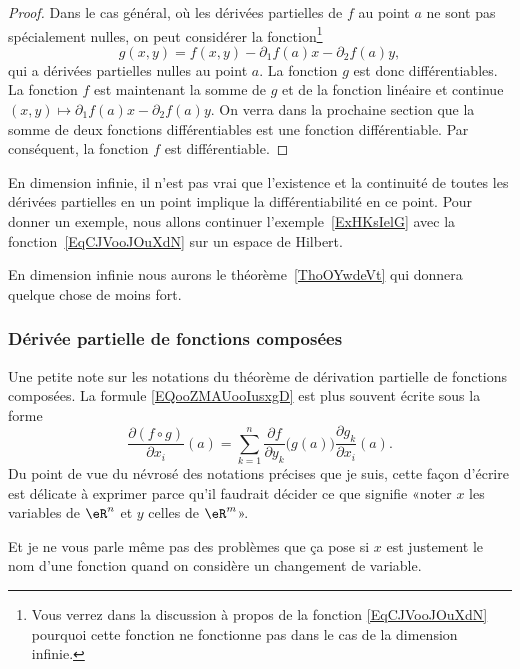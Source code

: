 \begin{proof}
	Dans le cas général, où les dérivées partielles de \( f\) au point \( a\) ne sont pas spécialement nulles, on peut considérer la fonction\footnote{Vous verrez dans la discussion à propos de la fonction \eqref{EqCJVooJOuXdN} pourquoi cette fonction ne fonctionne pas dans le cas de la dimension infinie.}
	\begin{equation}    \label{EqXHVooJeQKrB}
		g(x,y)=f(x,y)-\partial_1 f(a)x-\partial_2 f(a)y,
	\end{equation}
	qui a dérivées partielles nulles au point \( a\). La fonction \( g\) est donc différentiables. La fonction \( f\) est maintenant la somme de \( g\) et de la fonction linéaire et continue \( (x,y)\mapsto \partial_1 f(a)x-\partial_2 f(a)y\). On verra dans la prochaine section que la somme de deux fonctions différentiables est une fonction différentiable. Par conséquent, la fonction \( f\) est différentiable.
\end{proof}

\begin{remark}
	En dimension infinie, il n'est pas vrai que l'existence et la continuité de toutes les dérivées partielles en un point implique la différentiabilité en ce point. Pour donner un exemple, nous allons continuer l'exemple~\ref{ExHKsIelG}
	avec la fonction~\ref{EqCJVooJOuXdN} sur un espace de Hilbert.

	En dimension infinie nous aurons le théorème~\ref{ThoOYwdeVt} qui donnera quelque chose de moins fort.
\end{remark}

\subsubsection{Dérivée partielle de fonctions composées}

\begin{normaltext}
	Une petite note sur les notations du théorème de dérivation partielle de fonctions composées. La formule \eqref{EQooZMAUooIusxgD} est plus souvent écrite sous la forme
	\begin{equation}
		\frac{ \partial (f\circ g) }{ \partial x_i }(a)=\sum_{k=1}^n\frac{ \partial f }{ \partial y_k }\big( g(a) \big)\frac{ \partial g_k }{ \partial x_i }(a).
	\end{equation}
	Du point de vue du névrosé des notations précises que je suis, cette façon d'écrire est délicate à exprimer parce qu'il faudrait décider ce que signifie «noter \( x\) les variables de \( \eR^n\) et \( y\) celles de \( \eR^m\)».

	Et je ne vous parle même pas des problèmes que ça pose si \( x\) est justement le nom d'une fonction quand on considère un changement de variable.
\end{normaltext}

